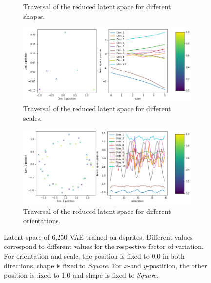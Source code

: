 \documentclass[11pt,a4paper]{article}
\begin{document}
\begin{figure}[H]
\begin{subfigure}{.48\textwidth}
\caption{Traversal of the reduced latent space for different shapes.}
\end{subfigure}
\begin{subfigure}{.48\textwidth}
\includegraphics[width=\textwidth]{images/latent_space_traversals/vae_6250_dsprites_latent_space_values_scale.png}
\caption{Traversal of the reduced latent space for different scales.}
\end{subfigure}
\begin{subfigure}{.48\textwidth}
\includegraphics[width=\textwidth]{images/latent_space_traversals/vae_6250_dsprites_latent_space_values_orientation.png}
\caption{Traversal of the reduced latent space for different orientations.}
\end{subfigure}
\caption[\ac{VAE} on dsprites: Latent Space Values]{Latent space of 6,250-\ac{VAE} trained on dsprites. Different values correspond to different values for the respective factor of variation. For orientation and scale, the position is fixed to 0.0 in both directions, shape is fixed to \textit{Square}. For $x$-and $y$-postition, the other position is fixed to 1.0 and shape is fixed to \textit{Square}.}
\label{fig:vae_dsprite_6250_latent_space_position}
\end{figure}
\end{document}
